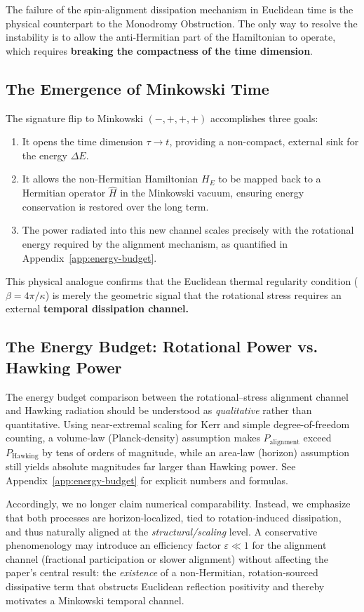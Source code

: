 \documentclass[11pt]{article}
\begin{document}
The failure of the spin-alignment dissipation mechanism in Euclidean time is the physical counterpart to the Monodromy Obstruction. The only way to resolve the instability is to allow the anti-Hermitian part of the Hamiltonian to operate, which requires \textbf{breaking the compactness of the time dimension}.

\subsection{The Emergence of Minkowski Time}

The signature flip to Minkowski $(-,+,+,+)$ accomplishes three goals:
\begin{enumerate}
    \item It opens the time dimension $\tau \to t$, providing a non-compact, external sink for the energy $\Delta E$.
    \item It allows the non-Hermitian Hamiltonian $H_E$ to be mapped back to a Hermitian operator $\widehat{H}$ in the Minkowski vacuum, ensuring energy conservation is restored over the long term.
    \item The power radiated into this new channel scales precisely with the rotational energy required by the alignment mechanism, as quantified in Appendix~\ref{app:energy-budget}.
\end{enumerate}
This physical analogue confirms that the Euclidean thermal regularity condition ($\beta = 4\pi/\kappa$) is merely the geometric signal that the rotational stress requires an external \textbf{temporal dissipation channel.}

\subsection{The Energy Budget: Rotational Power vs. Hawking Power}\label{sec:energy-balance}

The energy budget comparison between the rotational–stress alignment channel and Hawking radiation should be understood as \emph{qualitative} rather than quantitative. Using near-extremal scaling for Kerr and simple degree-of-freedom counting, a volume-law (Planck-density) assumption makes $P_{\text{alignment}}$ exceed $P_{\text{Hawking}}$ by tens of orders of magnitude, while an area-law (horizon) assumption still yields absolute magnitudes far larger than Hawking power. See Appendix~\ref{app:energy-budget} for explicit numbers and formulas.

Accordingly, we no longer claim numerical comparability. Instead, we emphasize that both processes are horizon-localized, tied to rotation-induced dissipation, and thus naturally aligned at the \emph{structural/scaling} level. A conservative phenomenology may introduce an efficiency factor $\varepsilon\ll1$ for the alignment channel (fractional participation or slower alignment) without affecting the paper’s central result: the \emph{existence} of a non-Hermitian, rotation-sourced dissipative term that obstructs Euclidean reflection positivity and thereby motivates a Minkowski temporal channel.
\end{document}
